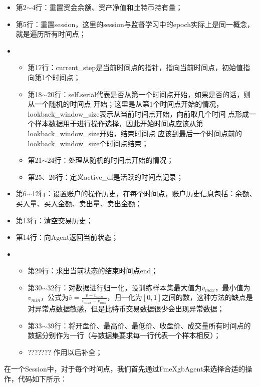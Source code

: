 \documentclass{article}
\begin{document}
\begin{itemize}
\item 第2$\sim$4行：重置资金余额、资产净值和比特币持有量；
\item 第5行：重置session，这里的session与监督学习中的epoch实际上是同一概念，就是遍历所有时间点；
\item   \begin{itemize}
        \item 第17行：current\_step是当前时间点的指针，指向当前时间点，初始值指向第1个时间点；
        \item 第18$\sim$20行：self.serial代表是否从第一个时间点开始，如果是否的话，则从一个随机的时间点
        开始；这里是从第1个时间点开始的情况，lookback\_window\_size表示从当前时间点开始，向前取几个时间
        点形成一个样本数据用于进行操作选择，因此开始时间点应该从第lookback\_window\_size开始，结束时间点
        应该到最后一个时间点前的lookback\_window\_size个时间点结束；
        \item 第21$\sim$24行：处理从随机的时间点开始的情况；
        \item 第25、26行：定义active\_df是活跃的时间点记录；
        \end{itemize}
\item 第6$\sim$12行：设置账户的操作历史，在每个时间点，账户历史信息包括：余额、买入量、买入金额、卖出量、卖出金额；
\item 第13行：清空交易历史；
\item 第14行：向Agent返回当前状态；
\item 
    \begin{itemize}
    \item 第29行：求出当前状态的结束时间点end；
    \item 第30$\sim$32行：对数据进行归一化，设训练样本集最大值为$v_{max}$，最小值为$v_{min}$，公式为$\hat{v}=\frac{v - v_{min}}{v_{max}-v_{min}}$，归一化为$[0,1]$之间的数，这种方法的缺点是对异常点数据敏感，但是比特币交易数据很少会出现异常数据；
    \item 第33$\sim$39行：将开盘价、最高价、最低价、收盘价、成交量所有时间点的数据分别作为一行（与数据集要求每一行代表一个样本相反）；
    \item ??????? 作用以后补全；
    \end{itemize}
\end{itemize}
在一个Session中，对于每个时间点，我们首先通过FmeXgbAgent来选择合适的操作，代码如下所示：
\end{document}
